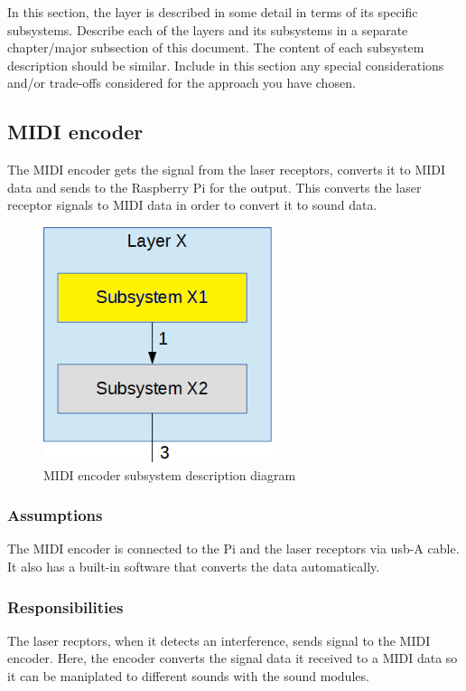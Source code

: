 In this section, the layer is described in some detail in terms of its specific subsystems. Describe each of the layers and its subsystems in a separate chapter/major subsection of this document. The content of each subsystem description should be similar. Include in this section any special considerations and/or trade-offs considered for the approach you have chosen.

\subsection{MIDI encoder}
The MIDI encoder gets the signal from the laser receptors, converts it to MIDI data and sends to the Raspberry Pi for the output. This converts the laser receptor signals to MIDI data in order to convert it to sound data.  

\begin{figure}[h!]
	\centering
 	\includegraphics[width=0.60\textwidth]{images/subsystem}
 \caption{MIDI encoder subsystem description diagram}
\end{figure}

\subsubsection{Assumptions}
The MIDI encoder is connected to the Pi and the laser receptors via usb-A cable. It also has a built-in software that converts the data automatically.

\subsubsection{Responsibilities}
The laser recptors, when it detects an interference, sends signal to the MIDI encoder. Here, the encoder converts the signal data it received to a MIDI data so it can be maniplated to different sounds with the sound modules.

